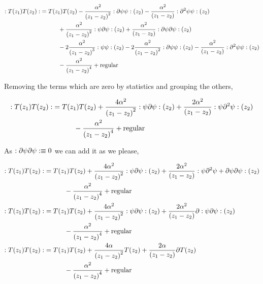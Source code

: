 \begin{align*}
    :T\qty(z_1) T\qty(z_2):&={ T\qty(z_1)T\qty(z_2)}-\frac{\alpha^2}{\qty(z_1-z_2)^2}:\partial\psi\psi:\qty(z_2)-\frac{\alpha^2}{\qty(z_1-z_2)}:\partial^2\psi\psi:\qty(z_2)\\
    &\quad\quad\quad+\frac{\alpha^2}{\qty(z_1-z_2)^2}:{\psi}\partial{\psi}:\qty(z_2)+\frac{\alpha^2}{\qty(z_1-z_2)}:\partial{\psi}\partial{\psi}:\qty(z_2)\\
    &\quad\quad\quad-2\frac{\alpha^2}{\qty(z_1-z_2)^3}:{\psi}{\psi}:\qty(z_2)-2\frac{\alpha^2}{\qty(z_1-z_2)^2}:\partial{\psi}{\psi}:\qty(z_2)-\frac{\alpha^2}{\qty(z_1-z_2)}:\partial^2{\psi}{\psi}:\qty(z_2)\\
    &\quad\quad\quad-\frac{\alpha^2}{\qty(z_1-z_2)^4}+\textnormal{regular}
\end{align*}

Removing the terms which are zero by statistics and grouping the others,

\begin{align*}
    :T\qty(z_1) T\qty(z_2):&={ T\qty(z_1)T\qty(z_2)}+\frac{4\alpha^2}{\qty(z_1-z_2)^2}:\psi\partial\psi:\qty(z_2)+\frac{2\alpha^2}{\qty(z_1-z_2)}:\psi\partial^2\psi:\qty(z_2)\\
    &\quad\quad\quad-\frac{\alpha^2}{\qty(z_1-z_2)^4}+\textnormal{regular}
\end{align*}

As $:\partial\psi\partial\psi:\equiv0$ we can add it as we please,

\begin{align*}
    :T\qty(z_1) T\qty(z_2):&={ T\qty(z_1)T\qty(z_2)}+\frac{4\alpha^2}{\qty(z_1-z_2)^2}:\psi\partial\psi:\qty(z_2)+\frac{2\alpha^2}{\qty(z_1-z_2)}:\psi\partial^2\psi+\partial\psi\partial\psi:\qty(z_2)\\
    &\quad\quad\quad-\frac{\alpha^2}{\qty(z_1-z_2)^4}+\textnormal{regular}\\
    :T\qty(z_1) T\qty(z_2):&={ T\qty(z_1)T\qty(z_2)}+\frac{4\alpha^2}{\qty(z_1-z_2)^2}:\psi\partial\psi:\qty(z_2)+\frac{2\alpha^2}{\qty(z_1-z_2)}\partial:\psi\partial\psi:\qty(z_2)\\
    &\quad\quad\quad-\frac{\alpha^2}{\qty(z_1-z_2)^4}+\textnormal{regular}\\
    :T\qty(z_1) T\qty(z_2):&={ T\qty(z_1)T\qty(z_2)}+\frac{4\alpha}{\qty(z_1-z_2)^2}T\qty(z_2)+\frac{2\alpha}{\qty(z_1-z_2)}\partial T\qty(z_2)\\
    &\quad\quad\quad-\frac{\alpha^2}{\qty(z_1-z_2)^4}+\textnormal{regular}
\end{align*}

